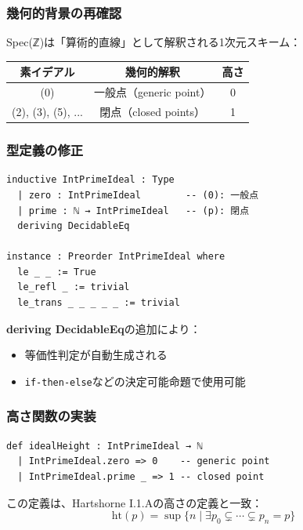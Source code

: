 \documentclass{ltjsarticle}
\begin{document}
\subsubsection{幾何的背景の再確認}

Spec(ℤ)は「算術的直線」として解釈される1次元スキーム：

\begin{center}
\begin{tabular}{|c|c|c|}
\hline
素イデアル & 幾何的解釈 & 高さ \\
\hline
(0) & 一般点（generic point） & 0 \\
(2), (3), (5), ... & 閉点（closed points） & 1 \\
\hline
\end{tabular}
\end{center}

\subsubsection{型定義の修正}

\begin{lstlisting}[caption=IntPrimeIdealの完全定義]
inductive IntPrimeIdeal : Type
  | zero : IntPrimeIdeal        -- (0): 一般点
  | prime : ℕ → IntPrimeIdeal   -- (p): 閉点
  deriving DecidableEq

instance : Preorder IntPrimeIdeal where
  le _ _ := True
  le_refl _ := trivial
  le_trans _ _ _ _ _ := trivial
\end{lstlisting}

\textbf{deriving DecidableEq}の追加により：
\begin{itemize}
\item 等価性判定が自動生成される
\item \texttt{if-then-else}などの決定可能命題で使用可能
\end{itemize}

\subsubsection{高さ関数の実装}

\begin{lstlisting}[caption=idealHeightの定義]
def idealHeight : IntPrimeIdeal → ℕ
  | IntPrimeIdeal.zero => 0    -- generic point
  | IntPrimeIdeal.prime _ => 1 -- closed point
\end{lstlisting}

この定義は、Hartshorne I.1.Aの高さの定義と一致：
\begin{equation}
\text{ht}(p) = \sup\{n \mid \exists p_0 \subsetneq \cdots \subsetneq p_n = p\}
\end{equation}
\end{document}
